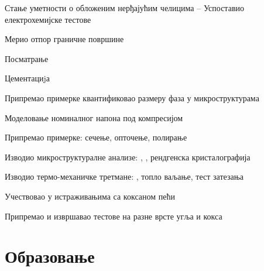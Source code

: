 \documentclass[11pt, a4paper, notitlepage]{article}
\begin{document}
	\begin{jobdetails}[T2A]
		\item Стање уметности о обложеним нерђајућим челицима – Успоставио електрохемијске тестове
		\item Мерио отпор граничне површине
		\item Посматрање 
	\end{jobdetails}

	\begin{jobdetails}[T2A]
		\item Цементациjа
		\item Припремао примерке квантификовао размеру фаза у микроструктурама
		\item Моделовање номиналног напона под компресијом
	\end{jobdetails}

	\begin{jobdetails}[T2A]
		\item Припремао примерке: сечење, опточење, полирање
		\item Изводио микроструктуралне анализе: , , рендгенска кристалографија
		\item Изводио термо-механичке третмане: , топло ваљање, тест затезања
	\end{jobdetails}

	\begin{jobdetails}[T2A]
		\item Учествовао у истраживањима са коксаном пећи
		\item Припремао и извршавао тестове на разне врсте угља и кокса
	\end{jobdetails}
	
	\newpage
	\section*{Образовање}
	
\end{document}
